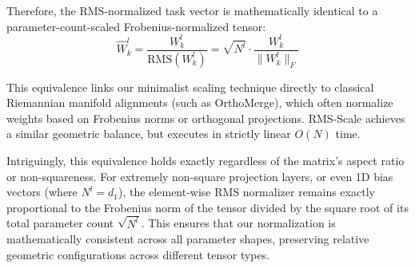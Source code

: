 Therefore, the RMS-normalized task vector is mathematically identical to a parameter-count-scaled Frobenius-normalized tensor:
\begin{equation}
\hat{W}_k^l = \frac{W_k^l}{\text{RMS}(W_k^l)} = \sqrt{N^l} \cdot \frac{W_k^l}{\| W_k^l \|_F}
\end{equation}

This equivalence links our minimalist scaling technique directly to classical Riemannian manifold alignments (such as OrthoMerge), which often normalize weights based on Frobenius norms or orthogonal projections. RMS-Scale achieves a similar geometric balance, but executes in strictly linear $O(N)$ time.

Intriguingly, this equivalence holds exactly regardless of the matrix's aspect ratio or non-squareness. For extremely non-square projection layers, or even 1D bias vectors (where $N^l = d_1$), the element-wise RMS normalizer remains exactly proportional to the Frobenius norm of the tensor divided by the square root of its total parameter count $\sqrt{N^l}$. This ensures that our normalization is mathematically consistent across all parameter shapes, preserving relative geometric configurations across different tensor types.

